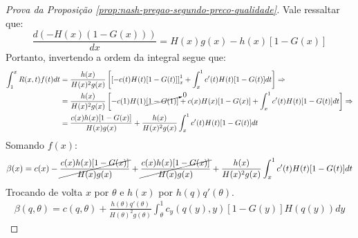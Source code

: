 \begin{proof}[Prova da Proposição \ref{prop:nash-pregao-segundo-preco-qualidade}]
	Vale ressaltar que:
	\begin{equation*}
		\frac{d(-H(x)(1-G(x)))}{dx} =  H(x)g(x)-h(x)[1-G(x)]
	\end{equation*}
	Portanto, invertendo a ordem da integral segue que:
	\begin{align*}
		\int_1^x R(x,t)f(t)dt & = \frac{h(x)}{H(x)^2g(x)} \left[ \left[ -c(t)H(t)[1-G(t)] \right]_x^1  + \int_x^1  c'(t)H(t)[1-G(t)] dt \right] \Rightarrow \\
		& = \frac{h(x)}{H(x)^2g(x)} \left[ -c(1)H(1)\cancelto{0}{[1-G(1)]} + c(x)H(x)[1-G(x)] + \int_x^1  c'(t)H(t)[1-G(t)] dt \right] \Rightarrow \\
		& = \frac{c(x)h(x)[1-G(x)]}{H(x)g(x)} + \frac{h(x)}{H(x)^2g(x)} \int_x^1  c'(t)H(t)[1-G(t)] dt
	\end{align*}
	Somando $f(x)$:
	\begin{align*}
		\beta(x) = c(x) - \cancel{\frac{c(x)h(x)[1-G(x)]}{H(x)g(x)}} + \cancel{\frac{c(x)h(x)[1-G(x)]}{H(x)g(x)}} + \frac{h(x)}{H(x)^2g(x)} \int_x^1  c'(t)H(t)[1-G(t)] dt
	\end{align*}
	Trocando de volta $x$ por $\theta$ e $h(x)$ por $h(q)q'(\theta)$.
	\begin{align*}
		\beta(q, \theta) = c(q, \theta) + \frac{h(\theta)q'(\theta)}{H(\theta)^2g(\theta)} \int_{\theta}^1 c_y(q(y), y)[1-G(y)]H(q(y))dy
	\end{align*}
\end{proof}